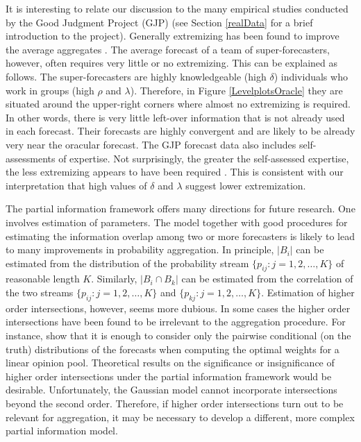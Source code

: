 \documentclass[12pt]{article}
\theoremstyle{definition}
\theoremstyle{definition}
\begin{document}
It is interesting to relate our discussion to the many empirical
studies conducted by the Good Judgment Project (GJP) (see Section
\ref{realData} for a brief introduction to the project).  Generally
extremizing has been found to improve the average aggregates
\citep{mellers2014psychological, satopaa, satopaa2014probability}.
The average forecast of a team of super-forecasters, however, often
requires very little or no extremizing.  This can be explained as follows.  The super-forecasters are
highly knowledgeable (high $\delta$) individuals who work
 in groups (high $\rho$ and $\lambda$).  Therefore, in
Figure \ref{LevelplotsOracle} they are situated around the upper-right
corners where almost no extremizing is required.  In other words,
there is very little left-over information that is not already used in each
forecast.  Their forecasts are highly convergent and are likely to be
already very near the oracular forecast.  The GJP forecast data also
includes self-assessments of expertise.  Not surprisingly, the greater
the self-assessed expertise, the less extremizing appears to have been
required \citep{satopaa}.  This is consistent with our interpretation that high values
of $\delta$ and $\lambda$ suggest lower extremization.

The partial information framework offers many directions for future research.  One involves estimation of parameters.  The model together with good procedures for estimating
the information overlap among two or more forecasters is likely to lead to many
improvements in probability aggregation. 
In principle, $|B_i|$ can be
estimated from the distribution of the probability stream $\{p_{ij} : j = 1, 2, \dots, K\}$ of reasonable length $K$. Similarly, $|B_i \cap B_k|$ can be estimated from the correlation of the two streams $\{p_{ij} : j = 1, 2, \dots, K\}$ and $\{p_{kj} : j = 1, 2, \dots, K\}$.  Estimation of higher order intersections, however, seems more
dubious. In some cases the higher order intersections have been found to be irrelevant to the aggregation procedure. For instance, \citet{degroot1991optimal} show that it is enough to consider only the pairwise conditional (on the truth) distributions of the forecasts when computing the optimal weights for a linear opinion pool. 
Theoretical results on the significance or insignificance
of higher order intersections under the partial information framework
would be desirable. Unfortunately, the Gaussian model cannot incorporate intersections beyond the second order. Therefore, if higher order intersections turn out to be relevant for aggregation, it may be necessary to develop a different, more complex partial information model. 
\end{document}
